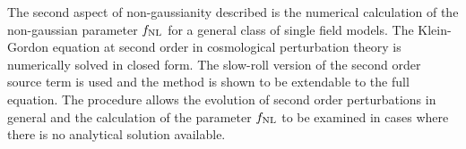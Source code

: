 The second aspect of non-gaussianity described is the numerical calculation
of the non-gaussian parameter $f_{\mathrm{NL}}$ for a general class of single field models.
The Klein-Gordon equation at second
order in cosmological perturbation theory is numerically solved in closed form. 
The slow-roll
version of the second order source term is used and the method is
shown to be extendable to the full equation.
The procedure allows the evolution of second order
perturbations in general and the calculation of the parameter
$f_{\mathrm{NL}}$ to be examined in cases where there is no analytical solution available. 

